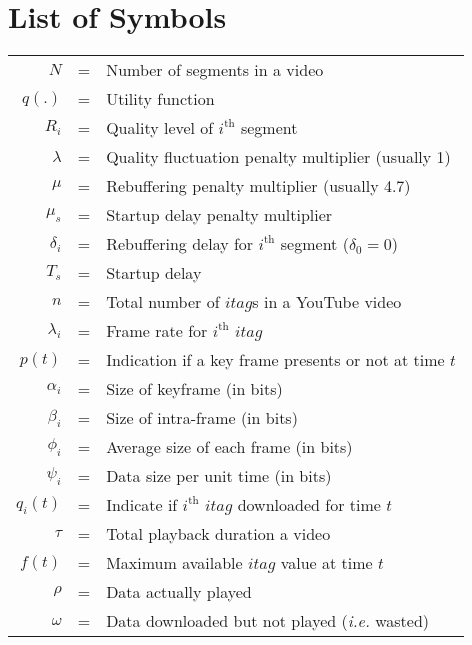 \chapter*{List of Symbols}

\begin{table}[h!]
\begin{tabular}{rcl}
	$N$ &=& Number of segments in a video \\
	$q(.)$ &=& Utility function \\
	$R_i$ &=& Quality level of $i^\text{th}$ segment \\
	$\lambda$ &=& Quality fluctuation penalty multiplier (usually 1) \\
	$\mu$ &=& Rebuffering penalty multiplier (usually 4.7) \\
	$\mu_s$ &=& Startup delay penalty multiplier \\
	$\delta_i$ &=& Rebuffering delay for $i^\text{th}$ segment ($\delta_0 = 0$) \\
	$T_s$ &=& Startup delay \\
	$n$ &=& Total number of $itag$s in a YouTube video\\
	$\lambda_i$ &=& Frame rate for $i^\text{th}$ $itag$ \\
	$p(t)$ &=& Indication if a key frame presents or not at time $t$ \\
	$\alpha_i$ &=& Size of keyframe (in bits) \\
	$\beta_i$ &=& Size of intra-frame (in bits) \\
	$\phi_i$ &=& Average size of each frame (in bits) \\
	$\psi_i$ &=& Data size per unit time (in bits) \\
	$q_i(t)$ &=& Indicate if $i^\text{th}$ $itag$ downloaded for time $t$ \\
	$\tau$ &=& Total playback duration a video \\
	$f(t)$ &=& Maximum available $itag$ value at time $t$ \\
	$\rho$ &=& Data actually played \\
	$\omega$ &=& Data downloaded but not played ({\it i.e.} wasted) \\

\end{tabular}
\end{table}
